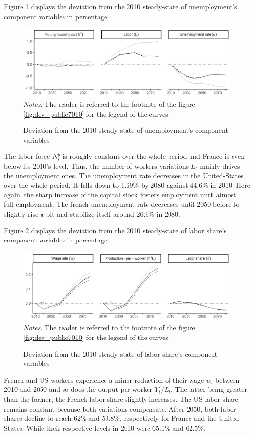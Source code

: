 Figure \ref{fig:dev_unemp1080} displays the deviation from the 2010 steady-state of unemployment's component variables in percentage.
\begin{figure}[tb]
	\centering
	\caption{Deviation from the 2010 steady-state of unemployment's component variables} \label{fig:dev_unemp1080}
	\includegraphics[width=1\linewidth]{../result/deviation/dev_unemp1080.png}
	\vspace{-4ex}
	\justify\singlespacing\footnotesize \textit{Notes:} The reader is referred to the footnote of the figure \ref{fig:dev_public7010} for the legend of the curves.
\end{figure}
The labor force $N^y_t$ is roughly constant over the whole period and France is even below its 2010's level. Thus, the number of workers variations $L_t$ mainly drives the unemployment ones. The unemployment rate decreases in the United-States over the whole period. It falls down to 1.69\% by 2080 against 44.6\% in 2010. Here again, the sharp increase of the capital stock fosters employment until almost full-employment. The french unemployment rate decreases until 2050 before to slightly rise a bit and stabilize itself around 26.9\% in 2080.

Figure \ref{fig:dev_laborshare1080} displays the deviation from the 2010 steady-state of labor share's component variables in percentage.
\begin{figure}[tb]
	\centering
	\caption{Deviation from the 2010 steady-state of labor share's component variables} \label{fig:dev_laborshare1080}
	\includegraphics[width=1\linewidth]{../result/deviation/dev_laborshare1080.png}
	\vspace{-6ex}
	\justify\singlespacing\footnotesize \textit{Notes:} The reader is referred to the footnote of the figure \ref{fig:dev_public7010} for the legend of the curves.
\end{figure}
French and US workers experience a minor reduction of their wage $w_t$ between 2010 and 2050 and so does the output-per-worker $Y_t/L_t$. The latter being greater than the former, the French labor share slightly increases. The US labor share remains constant because both variations compensate. After 2050, both labor shares decline to reach 62\% and 59.8\%, respectively for France and the United-States. While their respective levels in 2010 were 65.1\% and 62.5\%.

